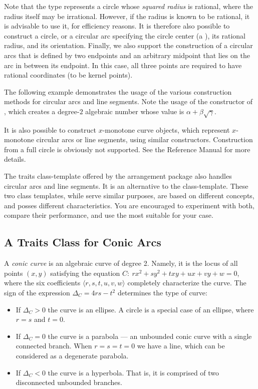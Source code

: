 Note that the  type represents a circle whose
\emph{squared radius} is rational, where the radius itself may be irrational.
However, if the radius is known to be rational, it is advisable to use it,
for efficiency reasons. It is therefore also possible to construct a circle,
or a circular arc specifying the circle center (a ), its
rational radius, and its orientation. Finally, we also support the construction
of a circular arcs that is defined by two endpoints and an arbitrary midpoint
that lies on the arc in between its endpoint. In this case, all three points
are required to have rational coordinates (to be kernel points).

The following example demonstrates the usage of the various construction
methods for circular arcs and line segments. Note the usage of the constructor
of , which creates a degree-$2$ algebraic
number whose value is $\alpha + \beta\sqrt{\gamma}$.


It is also possible to construct $x$-monotone curve objects, which represent
$x$-monotone circular arcs or line segments, using similar constructors.
Construction from a full circle is obviously not supported. See the Reference
Manual for more details.

The traits class-template
 offered by the
arrangement package also handles circular arcs and line segments. It
is an alternative to the 
class-template. These two class templates, while serve similar
purposes, are based on different concepts, and posses different
characteristics. You are encouraged to experiment with both, compare
their performance, and use the most suitable for your case.

\subsection{A Traits Class for Conic Arcs\label{arr_ssec:tr_conic}}

A {\em conic curve} is an algebraic curve of degree 2. Namely, it
is the locus of all points $(x,y)$ satisfying the equation $C:\ r
x^2 + s y^2 + t xy + u x + v y + w = 0$, where the six
coefficients $\langle r, s, t, u, v, w \rangle$ completely
characterize the curve. The sign of the expression $\Delta_{C} = 4
r s - t^2$ determines the type of curve:
\begin{itemize}
\item If $\Delta_{C} > 0$ the curve is an ellipse. A circle is a
special case of an ellipse, where $r = s$ and $t = 0$.
%
\item If $\Delta_{C} = 0$ the curve is a parabola --- an unbounded
conic curve with a single connected branch. When $r = s = t = 0$
we have a line, which can be considered as a degenerate parabola.
%
\item If $\Delta_{C} < 0$ the curve is a hyperbola. That is, it
is comprised of two disconnected unbounded branches.
\end{itemize}

